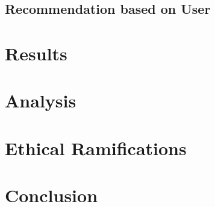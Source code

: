 \documentclass[11pt]{article}
\begin{document}
\subsection{Recommendation based on User}


\section{Results}

\section{Analysis}

\section{Ethical Ramifications}


\section{Conclusion}



\end{document}
